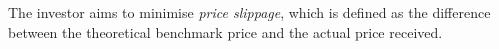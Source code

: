 The investor aims to minimise \textit{price slippage}, which is defined as the difference between the theoretical benchmark price and the actual price received.

%

